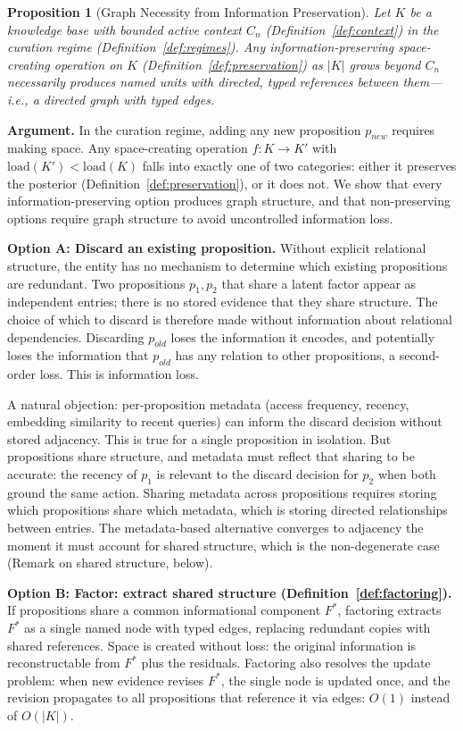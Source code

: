 \documentclass[11pt]{article}
\newtheorem{proposition}{Proposition}
\theoremstyle{definition}
\begin{document}
\begin{proposition}[Graph Necessity from Information Preservation]
\label{thm:graph-info}
Let $K$ be a knowledge base with bounded active context $C_n$
(Definition~\ref{def:context}) in the curation regime
(Definition~\ref{def:regimes}). Any information-preserving
space-creating operation on $K$ (Definition~\ref{def:preservation}) as $|K|$
grows beyond $C_n$ necessarily produces named units with directed,
typed references between them---i.e., a directed graph with typed edges.
\end{proposition}

\textbf{Argument.}
In the curation regime, adding any new proposition $p_{new}$ requires
making space. Any space-creating operation $f : K \to K'$ with
$\mathrm{load}(K') < \mathrm{load}(K)$ falls into exactly one of two categories: either it
preserves the posterior (Definition~\ref{def:preservation}), or it does
not. We show that every information-preserving option produces graph
structure, and that non-preserving options require graph structure to
avoid uncontrolled information loss.

\textbf{Option A: Discard an existing proposition.}
Without explicit relational structure, the entity has no mechanism to
determine which existing propositions are redundant. Two propositions
$p_1, p_2$ that share a latent factor appear as independent entries;
there is no stored evidence that they share structure. The choice of
which to discard is therefore made without information about relational
dependencies. Discarding $p_{old}$ loses the information it encodes, and
potentially loses the information that $p_{old}$ has any relation to
other propositions, a second-order loss. This is information loss.

A natural objection: per-proposition metadata (access frequency, recency,
embedding similarity to recent queries) can inform the discard decision
without stored adjacency. This is true for a single proposition in
isolation. But propositions share structure, and metadata must reflect
that sharing to be accurate: the recency of $p_1$ is relevant to the
discard decision for $p_2$ when both ground the same action. Sharing
metadata across propositions requires storing which propositions share
which metadata, which is storing directed relationships between entries.
The metadata-based alternative converges to adjacency the moment it
must account for shared structure, which is the non-degenerate case
(Remark on shared structure, below).

\textbf{Option B: Factor: extract shared structure
(Definition~\ref{def:factoring}).}
If propositions share a common informational component $F^*$, factoring
extracts $F^*$ as a single named node with typed edges, replacing
redundant copies with shared references. Space is created without loss:
the original information is reconstructable from $F^*$ plus the
residuals. Factoring also resolves the update problem: when new evidence
revises $F^*$, the single node is updated once, and the revision
propagates to all propositions that reference it via edges:
$O(1)$ instead of $O(|K|)$.
\end{document}
